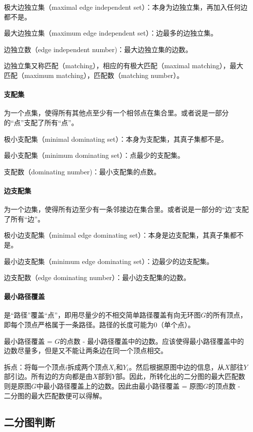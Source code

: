极大边独立集（maximal edge independent set）：本身为边独立集，再加入任何边都不是。

最大边独立集（maximum edge independent set）：边最多的边独立集。

边独立数（edge independent number)：最大边独立集的边数。

边独立集又称匹配（matching），相应的有极大匹配（maximal matching），最大匹配（maximum matching），匹配数（matching number）。

\paragraph{支配集} 为一个点集，使得所有其他点至少有一个相邻点在集合里。或者说是一部分的“点”支配了所有“点”。

极小支配集（minimal dominating set）：本身为支配集，其真子集都不是。

最小支配集（minimum dominating set）：点最少的支配集。

支配数（dominating number)：最小支配集的点数。

\paragraph{边支配集} 为一个边集，使得所有边至少有一条邻接边在集合里。或者说是一部分的“边”支配了所有“边”。

极小边支配集（minimal edge dominating set）：本身是边支配集，其真子集都不是。

最小边支配集（minimum edge dominating set）：边最少的边支配集。

边支配数（edge dominating number）：最小边支配集的边数。

\paragraph{最小路径覆盖} 是“路径”覆盖“点”，即用尽量少的不相交简单路径覆盖有向无环图$G$的所有顶点，即每个顶点严格属于一条路径。路径的长度可能为0（单个点）。

最小路径覆盖 = $G$的点数 - 最小路径覆盖中的边数。应该使得最小路径覆盖中的边数尽量多，但是又不能让两条边在同一个顶点相交。

拆点：将每一个顶点$i$拆成两个顶点$X_i$和$Y_i$。然后根据原图中边的信息，从$X$部往$Y$部引边。所有边的方向都是由$X$部到$Y$部。因此，所转化出的二分图的最大匹配数则是原图$G$中最小路径覆盖上的边数。因此由最小路径覆盖 = 原图$G$的顶点数 - 二分图的最大匹配数便可以得解。

\subsection{二分图判断}

